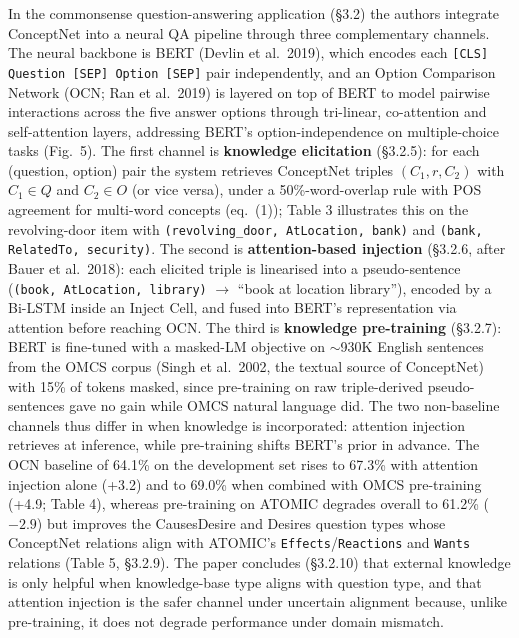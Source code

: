 \documentclass[11pt, a4paper]{article}
\begin{document}
\begin{prosebox}[(compact)]
In the commonsense question-answering application (§3.2) the authors integrate ConceptNet into a neural QA pipeline through three complementary channels. The neural backbone is BERT (Devlin et al.\ 2019), which encodes each \texttt{[CLS] Question [SEP] Option [SEP]} pair independently, and an Option Comparison Network (OCN; Ran et al.\ 2019) is layered on top of BERT to model pairwise interactions across the five answer options through tri-linear, co-attention and self-attention layers, addressing BERT's option-independence on multiple-choice tasks (Fig.\ 5). The first channel is \textbf{knowledge elicitation} (§3.2.5): for each (question, option) pair the system retrieves ConceptNet triples \((C_1, r, C_2)\) with \(C_1 \in Q\) and \(C_2 \in O\) (or vice versa), under a 50\%-word-overlap rule with POS agreement for multi-word concepts (eq.\ (1)); Table 3 illustrates this on the revolving-door item with \texttt{(revolving\_door, AtLocation, bank)} and \texttt{(bank, RelatedTo, security)}. The second is \textbf{attention-based injection} (§3.2.6, after Bauer et al.\ 2018): each elicited triple is linearised into a pseudo-sentence (\texttt{(book, AtLocation, library)} \(\to\) ``book at location library''), encoded by a Bi-LSTM inside an Inject Cell, and fused into BERT's representation via attention before reaching OCN. The third is \textbf{knowledge pre-training} (§3.2.7): BERT is fine-tuned with a masked-LM objective on $\sim$930K English sentences from the OMCS corpus (Singh et al.\ 2002, the textual source of ConceptNet) with 15\% of tokens masked, since pre-training on raw triple-derived pseudo-sentences gave no gain while OMCS natural language did. The two non-baseline channels thus differ in when knowledge is incorporated: attention injection retrieves at inference, while pre-training shifts BERT's prior in advance. The OCN baseline of 64.1\% on the development set rises to 67.3\% with attention injection alone (+3.2) and to 69.0\% when combined with OMCS pre-training (+4.9; Table 4), whereas pre-training on ATOMIC degrades overall to 61.2\% ($-2.9$) but improves the CausesDesire and Desires question types whose ConceptNet relations align with ATOMIC's \texttt{Effects}/\texttt{Reactions} and \texttt{Wants} relations (Table 5, §3.2.9). The paper concludes (§3.2.10) that external knowledge is only helpful when knowledge-base type aligns with question type, and that attention injection is the safer channel under uncertain alignment because, unlike pre-training, it does not degrade performance under domain mismatch.
\end{prosebox}
\end{document}
